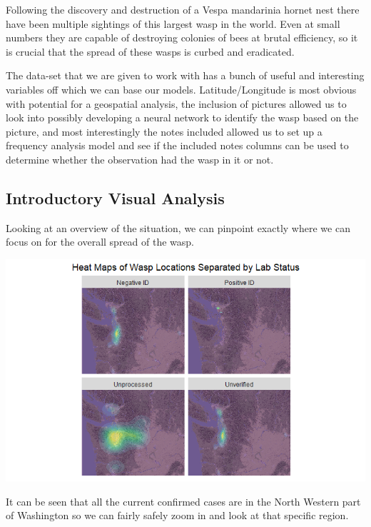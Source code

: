 \documentclass[2126824.tex]{subfiles}
\begin{document}
Following the discovery and destruction of a Vespa mandarinia hornet nest there have been multiple sightings of this largest wasp in the world. Even at small numbers they are capable of destroying colonies of bees at brutal efficiency, so it is crucial that the spread of these wasps is curbed and eradicated.

The data-set that we are given to work with has a bunch of useful and interesting variables off which we can base our models. Latitude/Longitude is most obvious with potential for a geospatial analysis, the inclusion of pictures allowed us to look into possibly developing a neural network to identify the wasp based on the picture, and most interestingly the notes included allowed us to set up a frequency analysis model and see if the included notes columns can be used to determine whether the observation had the wasp in it or not.

\subsection{Introductory Visual Analysis}

Looking at an overview of the situation, we can pinpoint exactly where we can focus on for the overall spread of the wasp.

\includegraphics[width=\textwidth]{name/facet_full.png}

It can be seen that all the current confirmed cases are in the North Western part of Washington so we can fairly safely zoom in and look at that specific region. 
\end{document}
